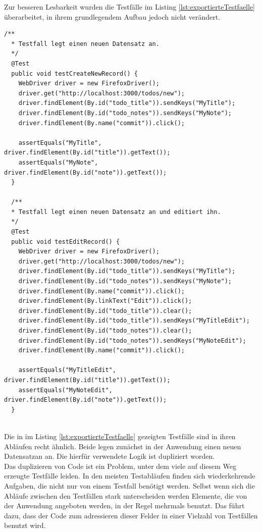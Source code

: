 Zur besseren Lesbarkeit wurden die Testfälle im Listing \ref{lst:exportierteTestfaelle} überarbeitet, in ihrem grundlegendem Aufbau jedoch nicht verändert.\\
\begin{lstlisting}[caption={Exportierte Testfälle},label={lst:exportierteTestfaelle}]
  /**
  * Testfall legt einen neuen Datensatz an.
  */
  @Test
  public void testCreateNewRecord() {
    WebDriver driver = new FirefoxDriver();
    driver.get("http://localhost:3000/todos/new");
    driver.findElement(By.id("todo_title")).sendKeys("MyTitle");
    driver.findElement(By.id("todo_notes")).sendKeys("MyNote");
    driver.findElement(By.name("commit")).click();
  
    assertEquals("MyTitle", driver.findElement(By.id("title")).getText());
    assertEquals("MyNote", driver.findElement(By.id("note")).getText());
  }
  
  /**
  * Testfall legt einen neuen Datensatz an und editiert ihn.
  */
  @Test
  public void testEditRecord() {
    WebDriver driver = new FirefoxDriver();
    driver.get("http://localhost:3000/todos/new");
    driver.findElement(By.id("todo_title")).sendKeys("MyTitle");
    driver.findElement(By.id("todo_notes")).sendKeys("MyNote");
    driver.findElement(By.name("commit")).click();
    driver.findElement(By.linkText("Edit")).click();
    driver.findElement(By.id("todo_title")).clear();
    driver.findElement(By.id("todo_title")).sendKeys("MyTitleEdit");
    driver.findElement(By.id("todo_notes")).clear();
    driver.findElement(By.id("todo_notes")).sendKeys("MyNoteEdit");
    driver.findElement(By.name("commit")).click();
    
    assertEquals("MyTitleEdit", driver.findElement(By.id("title")).getText());
    assertEquals("MyNoteEdit", driver.findElement(By.id("note")).getText());
  }
  
\end{lstlisting}
Die in im Listing \ref{lst:exportierteTestfaelle} gezeigten Testfälle sind in ihren Abläufen recht ähnlich. Beide legen zunächst in der Anwendung einen neuen Datensatzan an. Die hierfür verwendete Logik ist dupliziert worden.\\
Das duplizieren von Code ist ein Problem, unter dem viele auf diesem Weg erzeugte Testfälle leiden. In den meisten Testabläufen finden sich wiederkehrende Aufgaben, die nicht nur von einem Testfall benötigt werden.
Selbst wenn sich die Abläufe zwischen den Testfällen stark unterscheiden werden Elemente, die von der Anwendung angeboten werden, in der Regel mehrmals benutzt. Das führt dazu, dass der Code zum adressieren dieser Felder in einer Vielzahl von Testfällen benutzt wird.\\
